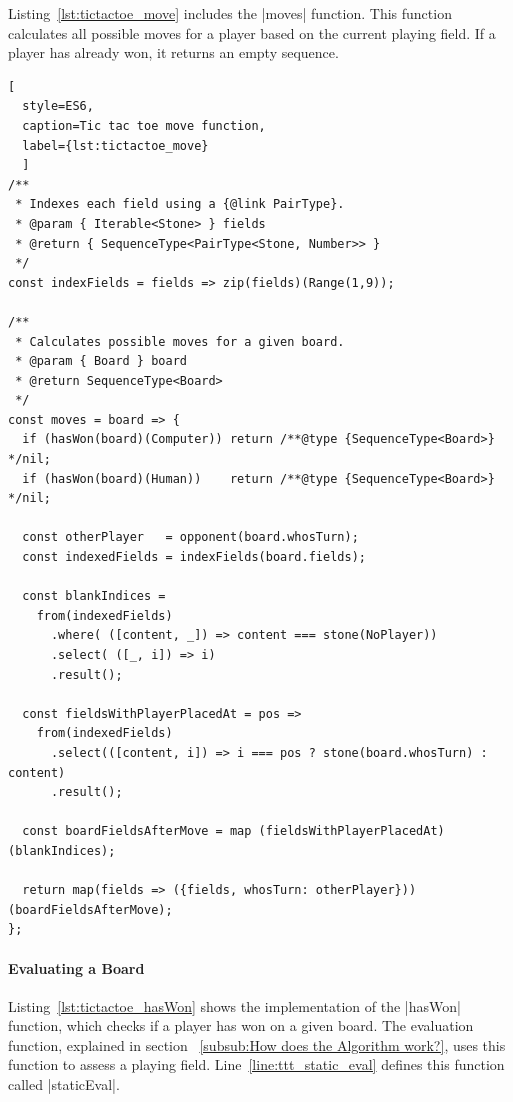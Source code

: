 Listing~\ref{lst:tictactoe_move} includes the |moves| function. This function
calculates all possible moves for a player based on the current playing field.
If a player has already won, it returns an empty sequence.
\begin{lstlisting}[
  style=ES6, 
  caption=Tic tac toe move function,
  label={lst:tictactoe_move}
  ]
/**
 * Indexes each field using a {@link PairType}.
 * @param { Iterable<Stone> } fields
 * @return { SequenceType<PairType<Stone, Number>> }
 */
const indexFields = fields => zip(fields)(Range(1,9));

/**
 * Calculates possible moves for a given board.
 * @param { Board } board
 * @return SequenceType<Board>
 */
const moves = board => {
  if (hasWon(board)(Computer)) return /**@type {SequenceType<Board>} */nil;
  if (hasWon(board)(Human))    return /**@type {SequenceType<Board>} */nil;

  const otherPlayer   = opponent(board.whosTurn);
  const indexedFields = indexFields(board.fields);

  const blankIndices =
    from(indexedFields)
      .where( ([content, _]) => content === stone(NoPlayer))
      .select( ([_, i]) => i)
      .result();

  const fieldsWithPlayerPlacedAt = pos =>
    from(indexedFields)
      .select(([content, i]) => i === pos ? stone(board.whosTurn) : content)
      .result();

  const boardFieldsAfterMove = map (fieldsWithPlayerPlacedAt) (blankIndices);

  return map(fields => ({fields, whosTurn: otherPlayer})) (boardFieldsAfterMove);
};
\end{lstlisting}

\paragraph{Evaluating a Board}
Listing~\ref{lst:tictactoe_hasWon} shows the implementation of the |hasWon|
function, which checks if a player has won on a given board. The evaluation
function, explained in section ~\ref{subsub:How does the Algorithm work?}, uses
this function to assess a playing field. Line~\ref{line:ttt_static_eval}
defines this function called |staticEval|.

